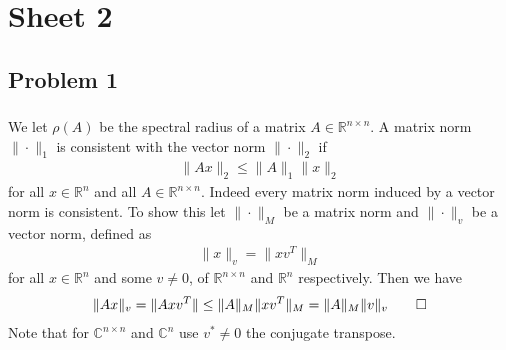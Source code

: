 

\usepackage[final]{pdfpages}


\maketitle
\tableofcontents
\section{Sheet 2}
\subsection{Problem 1}
\subsubsection{}
We let $\rho(A)$ be the spectral radius of a matrix $A \in
\mathbb{R}^{n\times n}$. A matrix norm $ \|\cdot\|_{1}$ is consistent with the
vector norm $\|\cdot\|_{2}$ if
\begin{align}
    \|Ax\|_{2} \le \|A\|_1\|x\|_2
\end{align}
for all $x \in \mathbb{R}^n$ and all $A \in \mathbb{R}^{n\times n}$. Indeed
every matrix norm induced by a vector norm is consistent. To show this let
$\|\cdot\|_M$ be a matrix norm and $\|\cdot\|_v$ be a vector norm, defined as
\begin{align}
    \|x\|_v = \|xv^T\|_M
\end{align}
for all $x \in \mathbb{R}^n$ and some $v \neq 0$, of $\mathbb{R}^{n \times
n}$ and $\mathbb{R}^{n}$ respectively. Then we have
\begin{align}
    \|Ax\|_v = \|Axv^T\| \le \|A\|_M \|xv^T\|_M = \|A\|_M \|v\|_v \qed
\end{align}
Note that for $\mathbb{C}^{n \times n}$ and $\mathbb{C}^{n}$ use $v^* \neq 0$ the
conjugate transpose.

